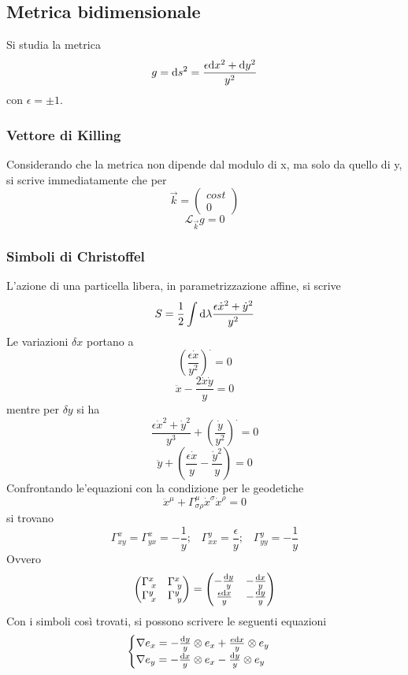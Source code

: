 \subsection{Metrica bidimensionale}
Si studia la metrica
\[ g = \mathrm{d} s^2 = \frac{\epsilon \mathrm{d} x^2 + \mathrm{d} y^2}{y^2} \]
con \( \epsilon = \pm 1\).

\subsubsection*{Vettore di Killing} \todo
Considerando che la metrica non dipende dal modulo di x, ma solo da quello di y, si scrive immediatamente che per 
\[ \vec{k} = \left( \begin{array}{c}  cost \\ 0 \end{array}  \right) \]
\[ \mathcal{L}_{\vec{k}} g = 0 \]

\subsubsection*{Simboli di Christoffel}
L'azione di una particella libera, in parametrizzazione affine, si scrive
\[ S = \frac{1}{2} \int \mathrm{d} \lambda \frac{\epsilon \dot{x}^2 + \dot{y}^2}{y^2} \]
Le variazioni $\delta x$ portano a 
\[ \left(\frac{\epsilon \dot{x}}{y^2}\right)^\cdot = 0 \]
\[ \ddot{x} - \frac{2\dot{x}\dot{y}}{y} = 0 \]
mentre per $\delta y$ si ha
\[ \frac{\epsilon \dot{x}^2 + \dot{y}^2}{y^3} + \left(\frac{\dot{y}}{y^2}\right)^\cdot =0 \]
\[ \ddot{y} + \left(\frac{\epsilon \dot{x}}{y} - \frac{\dot{y}^2}{y} \right) =0 \]
Confrontando le'equazioni con la condizione per le geodetiche
\[ \ddot{x}^\mu + \Gamma^\mu_{\sigma\rho} \dot{x}^\sigma\dot{x}^\rho =0 \]
si trovano
\[ \Gamma^x_{xy} = \Gamma^x_{yx} = -\frac{1}{y} ; \;\;\; \Gamma^y_{xx} = \frac{\epsilon}{y} ; \;\;\; \Gamma^y_{yy} = - \frac{1}{y} \]
Ovvero
\begin{equation}
	\begin{pmatrix}
		\Gamma^x_{\; x} & \Gamma^x_{\; y} \\
		\Gamma^y_{\; x} & \Gamma^y_{\; y} 
	\end{pmatrix} = 
	\begin{pmatrix}
		-\frac{\mathrm{d} y}{y} 	& -\frac{\mathrm{d} x}{y}  \\
		\frac{\epsilon\mathrm{d} x}{y} & -\frac{\mathrm{d} y}{y} 
	\end{pmatrix}
\end{equation}
Con i simboli cos\`i trovati, si possono scrivere le seguenti equazioni
\begin{equation} 
	\begin{cases}
		\nabla e_x = -\frac{\mathrm{d} y}{y} \otimes e_x + \frac{e \mathrm{d} x}{y} \otimes e_y & \\ 
		\nabla e_y = -\frac{\mathrm{d} x}{y} \otimes e_x - \frac{\mathrm{d} y}{y} \otimes e_y & \\
	\end{cases}
\end{equation}

